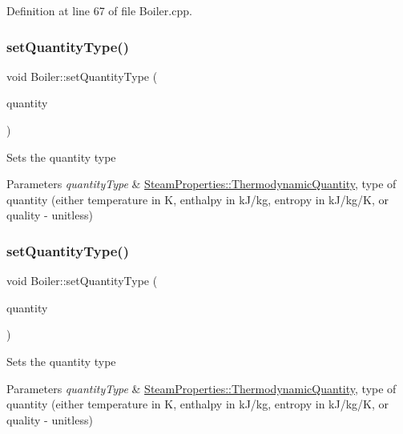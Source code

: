 Definition at line 67 of file Boiler.\+cpp.

\mbox{\label{class_boiler_a9c5b20cae6133c9174b12760f36d52c2}} 
\subsubsection{\texorpdfstring{set\+Quantity\+Type()}{setQuantityType()}\hspace{0.1cm}{\footnotesize\ttfamily [2/3]}}
{\footnotesize\ttfamily void Boiler\+::set\+Quantity\+Type (\begin{DoxyParamCaption}\item[{\hyperlink{class_steam_properties_ae0294bedf7d178c2d8fb6aed0f62fbff}{Steam\+Properties\+::\+Thermodynamic\+Quantity}}]{quantity }\end{DoxyParamCaption})}

Sets the quantity type 
\begin{DoxyParams}{Parameters}
{\em quantity\+Type} & \hyperlink{class_steam_properties_ae0294bedf7d178c2d8fb6aed0f62fbff}{Steam\+Properties\+::\+Thermodynamic\+Quantity}, type of quantity (either temperature in K, enthalpy in k\+J/kg, entropy in k\+J/kg/K, or quality -\/ unitless) \\
\hline
\end{DoxyParams}
\mbox{\label{class_boiler_a9c5b20cae6133c9174b12760f36d52c2}} 
\subsubsection{\texorpdfstring{set\+Quantity\+Type()}{setQuantityType()}\hspace{0.1cm}{\footnotesize\ttfamily [3/3]}}
{\footnotesize\ttfamily void Boiler\+::set\+Quantity\+Type (\begin{DoxyParamCaption}\item[{\hyperlink{class_steam_properties_ae0294bedf7d178c2d8fb6aed0f62fbff}{Steam\+Properties\+::\+Thermodynamic\+Quantity}}]{quantity }\end{DoxyParamCaption})}

Sets the quantity type 
\begin{DoxyParams}{Parameters}
{\em quantity\+Type} & \hyperlink{class_steam_properties_ae0294bedf7d178c2d8fb6aed0f62fbff}{Steam\+Properties\+::\+Thermodynamic\+Quantity}, type of quantity (either temperature in K, enthalpy in k\+J/kg, entropy in k\+J/kg/K, or quality -\/ unitless) \\
\hline
\end{DoxyParams}
\mbox{\label{class_boiler_ac3450d88dba124529d59baf62c39e14a}} 
